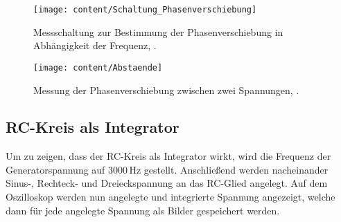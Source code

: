 \begin{figure}[h!]
	\centering
	\texttt{[image: content/Schaltung\_Phasenverschiebung]}
	\caption{Messschaltung zur Bestimmung der Phasenverschiebung in Abhängigkeit der Frequenz, \cite[7]{anleitung353}.}
	\label{fig:schaltungphasenverschiebung}
\end{figure}

\begin{figure}[h!]
	\centering
	\texttt{[image: content/Abstaende]}
	\caption{Messung der Phasenverschiebung zwischen zwei Spannungen, \cite[7]{anleitung353}.}
	\label{fig:abstaende}
\end{figure}

\subsection{RC-Kreis als Integrator}
Um zu zeigen, dass der RC-Kreis als Integrator wirkt, wird die Frequenz der Generatorspannung auf 3000\,Hz gestellt. Anschließend
werden nacheinander Sinus-, Rechteck- und Dreieckspannung an das RC-Glied angelegt. Auf dem Oszilloskop werden nun angelegte und
integrierte Spannung angezeigt, welche dann für jede angelegte Spannung als Bilder gespeichert werden.

